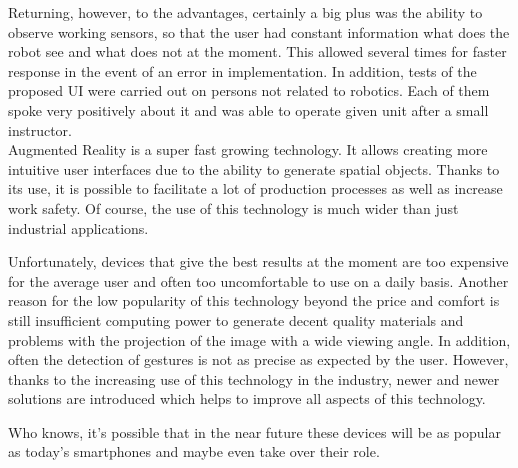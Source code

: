 \documentclass[printmode,en]{mgr}
\begin{document}
Returning, however, to the advantages, certainly a big plus was the ability to observe working sensors, so that the user had constant information what does the robot see and what does not at the moment. This allowed several times for faster response in the event of an error in implementation. In addition, tests of the proposed UI were carried out on persons not related to robotics. Each of them spoke very positively about it and was able to operate given unit after a small instructor.\\

Augmented Reality is a super fast growing technology. It allows creating more intuitive user interfaces due to the ability to generate spatial objects. Thanks to its use, it is possible to facilitate a lot of production processes as well as increase work safety. Of course, the use of this technology is much wider than just industrial applications.

Unfortunately, devices that give the best results at the moment are too expensive for the average user and often too uncomfortable to use on a daily basis. Another reason for the low popularity of this technology beyond the price and comfort is still insufficient computing power to generate decent quality materials and problems with the projection of the image with a wide viewing angle. In addition, often the detection of gestures is not as precise as expected by the user. However, thanks to the increasing use of this technology in the industry, newer and newer solutions are introduced which helps to improve all aspects of this technology.

Who knows, it's possible that in the near future these devices will be as popular as today's smartphones and maybe even take over their role.

\appendix




\end{document}

